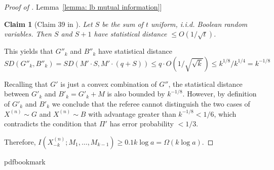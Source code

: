 \documentclass[11pt]{article}
\numberwithin{equation}{section}
\newtheorem{claim}[theorem]{Claim}
\theoremstyle{definition}
\theoremstyle{plain}
\newcommand{\expref}[2]{\hyperref[#2]{#1~\ref{#2}}}
\newcommand{\follows}{\ensuremath{\sim}}
\newcommand{\bigo}[1]{\ensuremath{{{O} \left( {#1} \right)}}}
\newcommand{\bigomega}[1]{\ensuremath{{\Omega \left( {#1} \right)}}}
\begin{document}
\begin{proof}[Proof of \expref{Lemma}{lemma: lb mutual information}]
\begin{claim}[Claim 39 in \cite{Viola:2013we}]
Let $S$ be the sum of $t$ uniform, i.i.d. Boolean random variables.
Then $S$ and $S+1$ have statistical distance $\le \bigo{1/\sqrt{t}}$. 
\end{claim}

This yields that $G''_k$ and $B''_k$ have statistical distance 
$$SD(G''_k, B''_k)=SD(M' \cdot S, M'\cdot(q+S))\le q\cdot \bigo{1/\sqrt{\sqrt{k}}}\le k^{1/8}/k^{1/4}=k^{-1/8}$$

Recalling that $G'$ is just a convex combination of $G''$, 
the statistical distance between $G'_k$ and $B'_k=G'_k+M$ is also bounded by $k^{-1/8}$. 
%
However, by definition of $G'_k$ and $B'_k$ we conclude that the referee cannot distinguish the two cases of $X^{(n)}\follows G$ and $X^{(n)}\follows B$ with advantage greater than $k^{-1/8}< 1/6$, which contradicts the condition that $\Pi'$ has error probability $<1/3$.
		
Therefore, 
$I\left(X^{(n)}_{-k}; M_1,\ldots, M_{k-1}\right)\ge 0.1 k\log a=\bigomega{k\log a}$.
\end{proof}	

\nocite{conf-version}


\newcommand{\prelim}{Preliminary version in\ }\newcommand{\prelims}{Preliminary
  versions in\ }
\providecommand{\bibhead}[1]{}
\expandafter\ifx\csname pdfbookmark\endcsname\relax%
  \providecommand{\tocrefpdfbookmark}{}
\else\providecommand{\tocrefpdfbookmark}{%
   \hypertarget{tocreferences}{}%
   \pdfbookmark[1]{References}{tocreferences}}%
\fi
\end{document}
